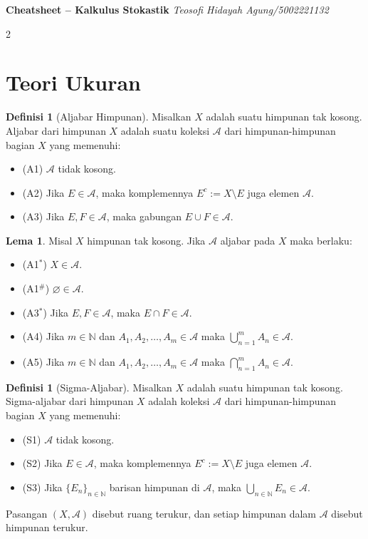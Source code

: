 \documentclass[a4paper,extrafontsizes, 9pt]{memoir}
\theoremstyle{definition}
\newtheorem{definisi}[kalstok]{Definisi}
\newtheorem{lemma}[kalstok]{Lema}
\theoremstyle{plain}
\theoremstyle{remark}
\begin{document}
\footnotesize \textbf{{Cheatsheet -- Kalkulus Stokastik}} \hfill \textit{Teosofi Hidayah Agung/5002221132}
\begin{multicols}{2}
  \section{\small Teori Ukuran}

  \begin{definisi}[Aljabar Himpunan]
    Misalkan $X$ adalah suatu himpunan tak kosong. Aljabar dari himpunan $X$ adalah suatu koleksi $\mathcal{A}$ dari himpunan-himpunan bagian $X$ yang memenuhi:
    \begin{itemize}[leftmargin=*, itemsep=0.5mm]
      \item (A1) $\mathcal{A}$ tidak kosong.
      \item (A2) Jika $E\in\mathcal{A}$, maka komplemennya $E^c:=X\setminus E$ juga elemen $\mathcal{A}$.
      \item (A3) Jika $E,F\in\mathcal{A}$, maka gabungan $E\cup F\in\mathcal{A}$.
    \end{itemize}
  \end{definisi}

  \begin{lemma}
    Misal $X$ himpunan tak kosong. Jika $\mathcal{A}$ aljabar pada $X$ maka berlaku:
    \begin{itemize}[leftmargin=*, itemsep=0.5mm]
      \item (A1$^*$) $X\in\mathcal{A}$.
      \item (A1$^{\#}$) $\varnothing\in\mathcal{A}$.
      \item (A3$^*$) Jika $E,F\in\mathcal{A}$, maka $E\cap F\in\mathcal{A}$.
      \item (A4) Jika $m\in\mathbb{N}$ dan $A_1,A_2,\ldots,A_m\in\mathcal{A}$ maka $\displaystyle\bigcup_{n=1}^{m}A_n\in\mathcal{A}$.
      \item (A5) Jika $m\in\mathbb{N}$ dan $A_1,A_2,\ldots,A_m\in\mathcal{A}$ maka $\displaystyle\bigcap_{n=1}^{m}A_n\in\mathcal{A}$.
    \end{itemize}
  \end{lemma}

  \begin{definisi}[Sigma-Aljabar]
    Misalkan $X$ adalah suatu himpunan tak kosong. Sigma-aljabar dari himpunan $X$ adalah koleksi $\mathcal{A}$ dari himpunan-himpunan bagian $X$ yang memenuhi:
    \begin{itemize}[leftmargin=*, itemsep=0.5mm]
      \item (S1) $\mathcal{A}$ tidak kosong.
      \item (S2) Jika $E\in\mathcal{A}$, maka komplemennya $E^c:=X\setminus E$ juga elemen $\mathcal{A}$.
      \item (S3) Jika $\{E_n\}_{n\in\mathbb{N}}$ barisan himpunan di $\mathcal{A}$, maka $\displaystyle\bigcup_{n\in\mathbb{N}}E_n\in\mathcal{A}$.
    \end{itemize}
    Pasangan $(X,\mathcal{A})$ disebut ruang terukur, dan setiap himpunan dalam $\mathcal{A}$ disebut himpunan terukur.
  \end{definisi}


\end{multicols}
\end{document}
